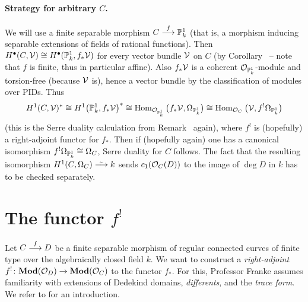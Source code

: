 \documentclass[a4paper,parskip=half,numbers=enddot, DIV=12]{scrreprt}
\begin{document}
\paragraph{Strategy for arbitrary $C$.} We will use a finite separable morphism $C\morphism[f]\IP_k^1$ (that is, a morphism inducing separable extensions of fields of rational functions). Then $H^\bullet(C,\mathcal{V})\cong H^\bullet (\mathbb{P}_k^1,f_*\mathcal{V})$ for every vector bundle $\mathcal{V}$ on $C$ (by Corollary~ -- note that $f$ is finite, thus in particular affine). Also $f_*\mathcal{V}$ is a coherent $\mathcal{O}_{\mathbb{P}_k^1}$-module and torsion-free (because $\mathcal{V}$ is), hence a vector bundle by the classification of modules over PIDs. Thus 
\begin{align*}
H^1(C,\mathcal{V})^*\cong H^1\big(\mathbb{P}_k^1,f_*\mathcal{V}\big)^*\cong \operatorname{Hom}_{\mathcal{O}_{\mathbb{P}_k^1}}\big(f_*\mathcal{V},\Omega_{\mathbb{P}_k^1}\big)\cong \operatorname{Hom}_{\mathcal{O}_C}\big(\mathcal{V},f^!\Omega_{\mathbb{P}_k^1}\big)
\end{align*}
(this is the Serre duality calculation from Remark~ again), where $f^!$ is (hopefully) a right-adjoint functor for $f_*$. Then if (hopefully again) one has a canonical isomorphism $f^!\Omega_{\mathbb{P}_k^1}\cong \Omega_C$, Serre duality for $C$ follows. The fact that the resulting isomorphism $H^1(C,\Omega_C)\isomorphism k$ sends $c_1(\mathcal{O}_C(D))$ to the image of $\deg D$ in $k$ has to be checked separately.

\section{The functor \texorpdfstring{$f^!$}{f}}
Let $C\morphism[f]D$ be a finite separable morphism of regular connected curves of finite type over the algebraically closed field $k$. We want to construct a \emph{right-adjoint} $f^!\colon\cat{Mod}(\Oo_D)\morphism\cat{Mod}(\Oo_C)$ to the functor $f_*$. For this, Professor Franke assumes familiarity with extensions of Dedekind domains, \emph{differents}, and the \emph{trace form}. We refer to \cite[Ch.~III, \S 2]{NEUKIRCH} for an introduction.
\end{document}

